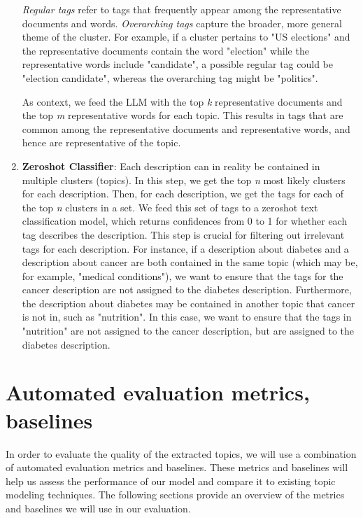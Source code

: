 \begin{enumerate}
    \textit{Regular tags} refer to tags that frequently appear among the representative documents and words. \textit{Overarching tags} capture the broader, more general theme of the cluster. For example, if a cluster pertains to "US elections" and the representative documents contain the word "election" while the representative words include "candidate", a possible regular tag could be "election candidate", whereas the overarching tag might be "politics".

    As context, we feed the LLM with the top \textit{k} representative documents and the top \textit{m} representative words for each topic. This results in tags that are common among the representative documents and representative words, and hence are representative of the topic.
    \item \textbf{Zeroshot Classifier}: Each description can in reality be contained in multiple clusters (topics). In this step, we get the top \textit{n} most likely clusters for each description. Then, for each description, we get the tags for each of the top \textit{n} clusters in a set. We feed this set of tags to a zeroshot text classification model, which returns confidences from 0 to 1 for whether each tag describes the description. This step is crucial for filtering out irrelevant tags for each description. For instance, if a description about diabetes and a description about cancer are both contained in the same topic (which may be, for example, "medical conditions"), we want to ensure that the tags for the cancer description are not assigned to the diabetes description. Furthermore, the description about diabetes may be contained in another topic that cancer is not in, such as "nutrition". In this case, we want to ensure that the tags in "nutrition" are not assigned to the cancer description, but are assigned to the diabetes description.

\end{enumerate}


\section{Automated evaluation metrics, baselines}
In order to evaluate the quality of the extracted topics, we will use a combination of automated evaluation metrics and baselines. These metrics and baselines will help us assess the performance of our model and compare it to existing topic modeling techniques. The following sections provide an overview of the metrics and baselines we will use in our evaluation.

